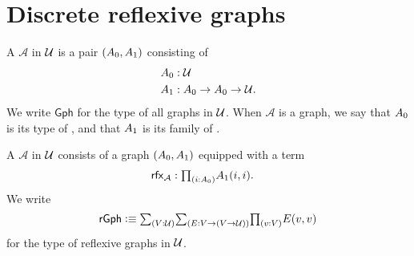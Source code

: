 \section{Discrete reflexive graphs}

\begin{defn}\label{defn:graphs_ctx}
A  $\mathcal{A}$ in $\mathcal{U}$ is a pair $\pairr{\pts{A},\edg{A}}$ consisting of
\begin{align*}
\pts{A} & : \UU \\
\edg{A} & : \pts{A}\to\pts{A}\to\UU.
\end{align*}
We write $\mathsf{Gph}$ for the type of all graphs in $\mathcal{U}$. When $\mathcal{A}$ is a graph, we say that $\pts{A}$ is its type of , and that $\edg{A}$ is its family of .

A  $\mathcal{A}$ in $\mathcal{U}$ consists of a graph $(\pts{A},\edg{A})$ equipped with a  term
\begin{align*}
\rfx{\mathcal{A}} & : \prd{i:\pts{A}}\edg{A}(i,i).
\end{align*}
We write
\begin{equation*}
\mathsf{rGph}\defeq \sm{V:\UU}{E:V\to (V\to\UU)}\prd{v:V}E(v,v)
\end{equation*}
for the type of reflexive graphs in $\mathcal{U}$. 
\end{defn}

